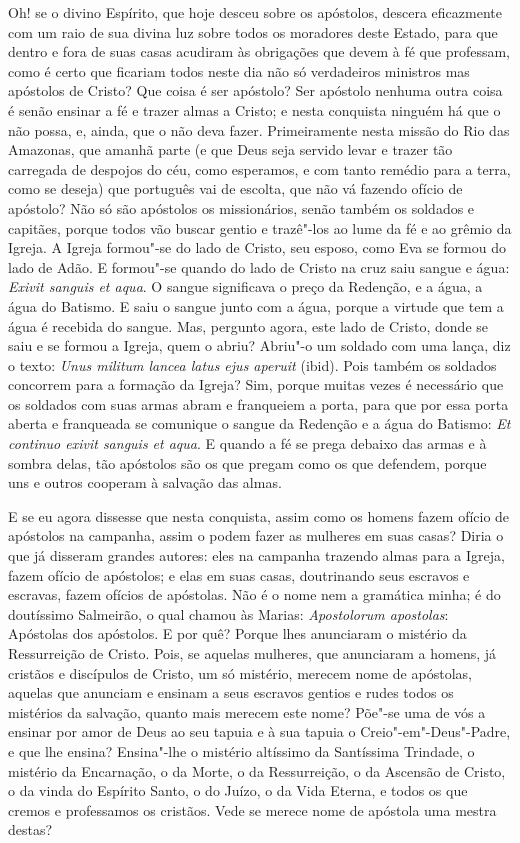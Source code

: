 Oh! se o divino Espírito, que hoje desceu sobre os apóstolos, descera
eficazmente com um raio de sua divina luz sobre todos os moradores deste
Estado, para que dentro e fora de suas casas acudiram às obrigações que
devem à fé que professam, como é certo que ficariam todos neste dia não
só verdadeiros ministros mas apóstolos de Cristo? Que coisa é ser
apóstolo? Ser apóstolo nenhuma outra coisa é senão ensinar a fé e trazer
almas a Cristo; e nesta conquista ninguém há que o não possa, e, ainda,
que o não deva fazer. Primeiramente nesta missão do Rio das Amazonas,
que amanhã parte (e que Deus seja servido levar e trazer tão
carregada de despojos do céu, como esperamos, e com tanto remédio para a
terra, como se deseja) que português vai de escolta, que não vá
fazendo ofício de apóstolo? Não só são apóstolos os missionários, senão
também os soldados e capitães, porque todos vão buscar gentio e
trazê"-los ao lume da fé e ao grêmio da Igreja. A Igreja formou"-se do
lado de Cristo, seu esposo, como Eva se formou do lado de Adão. E
formou"-se quando do lado de Cristo na cruz saiu sangue e água:
\emph{Exivit sanguis et aqua}. O sangue significava o preço %
da Redenção, e a água, a água do Batismo. E saiu o sangue junto com a
água, porque a virtude que tem a água é recebida do sangue. Mas,
pergunto agora, este lado de Cristo, donde se saiu e se formou a Igreja,
quem o abriu? Abriu"-o um soldado com uma lança, diz o texto: \emph{Unus
militum lancea latus ejus aperuit} (ibid). Pois também os soldados
concorrem para a formação da Igreja? Sim, porque muitas vezes é
necessário que os soldados com suas armas abram e franqueiem a porta,
para que por essa porta aberta e franqueada se comunique o sangue da
Redenção e a água do Batismo: \emph{Et continuo exivit sanguis et aqua}.
E quando a fé se prega debaixo das armas e à sombra delas, tão apóstolos
são os que pregam como os que defendem, porque uns e outros cooperam à
salvação das almas.

E se eu agora dissesse que nesta conquista, assim como os homens fazem
ofício de apóstolos na campanha, assim o podem fazer as mulheres em suas
casas? Diria o que já disseram grandes autores: eles na campanha
trazendo almas para a Igreja, fazem ofício de apóstolos; e elas em suas
casas, doutrinando seus escravos e escravas, fazem ofícios de apóstolas.
Não é o nome nem a gramática minha; é do doutíssimo Salmeirão, o qual
chamou às Marias: \emph{Apostolorum apostolas}: Apóstolas dos apóstolos.
E por quê? Porque lhes anunciaram o mistério da Ressurreição de Cristo.
Pois, se aquelas mulheres, que anunciaram a homens, já cristãos e
discípulos de Cristo, um só mistério, merecem nome de apóstolas, aquelas
que anunciam e ensinam a seus escravos gentios e rudes todos os
mistérios da salvação, quanto mais merecem este nome? Põe"-se uma de vós
a ensinar por amor de Deus ao seu tapuia e à sua tapuia o Creio"-em"-Deus"-Padre, e que lhe ensina? Ensina"-lhe o mistério altíssimo da
Santíssima Trindade, o mistério da Encarnação, o da Morte, o da Ressurreição, o da
Ascensão de Cristo, o da vinda do Espírito Santo, o do Juízo, o da Vida
Eterna, e todos os que cremos e professamos os cristãos. Vede se merece
nome de apóstola uma mestra destas?

